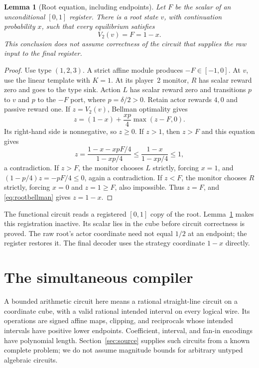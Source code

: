 \documentclass[11pt,a4paper]{article}
\numberwithin{equation}{section}
\newtheorem{lemma}[theorem]{Lemma}
\theoremstyle{definition}
\begin{document}
\begin{lemma}[Root equation, including endpoints]\label{lem:root}
Let \(F\) be the scalar of an unconditional \([0,1]\) register. There
is a root state \(v\), with continuation probability \(x\), such that
every equilibrium satisfies
\begin{equation}\label{eq:decode}
 V_2(v)=F=1-x.
\end{equation}
This conclusion does not assume correctness of the circuit that supplies
the raw input to the final register.
\end{lemma}
\begin{proof}
Use type \((1,2,3)\). A strict affine module produces \(-F\in[-1,0]\).
At \(v\), use the linear template with \(K=1\). At its player~2
monitor, \(R\) has scalar reward zero and goes to the type sink.
Action \(L\) has scalar reward zero and transitions \(p\) to \(v\)
and \(p\) to the \(-F\) port, where \(p=\delta/2>0\).
Retain actor rewards \(4,0\) and passive reward one. If \(z=V_2(v)\),
Bellman optimality gives
\begin{equation}\label{eq:rootbellman}
 z=(1-x)+\frac{xp}{4}\max(z-F,0).
\end{equation}
Its right-hand side is nonnegative, so \(z\geq0\). If \(z>1\), then
\(z>F\) and this equation gives
\[
 z=\frac{1-x-xpF/4}{1-xp/4}
   \leq\frac{1-x}{1-xp/4}\leq1,
\]
a contradiction.
If \(z>F\), the monitor chooses \(L\) strictly, forcing \(x=1\),
and \((1-p/4)z=-pF/4\leq0\), again a contradiction.
If \(z<F\), the monitor chooses \(R\) strictly, forcing \(x=0\)
and \(z=1\geq F\), also impossible. Thus \(z=F\), and
\eqref{eq:rootbellman} gives \(z=1-x\).
\end{proof}

The functional circuit reads a registered \([0,1]\) copy of the root.
Lemma~\ref{lem:root} makes this registration inactive. Its scalar lies
in the cube before circuit correctness is proved. The raw root's actor
coordinate need not equal \(1/2\) at an endpoint; the register restores
it. The final decoder uses the strategy coordinate \(1-x\) directly.

\section{The simultaneous compiler}\label{sec:compiler}

A bounded arithmetic circuit here means a rational straight-line circuit
on a coordinate cube, with a valid rational intended interval on every
logical wire. Its operations are signed affine maps, clipping, and
reciprocals whose intended intervals have positive lower endpoints.
Coefficient, interval, and fan-in encodings have polynomial length.
Section~\ref{sec:source} supplies such circuits from a known complete
problem; we do not assume magnitude bounds for arbitrary untyped
algebraic circuits.
\end{document}
